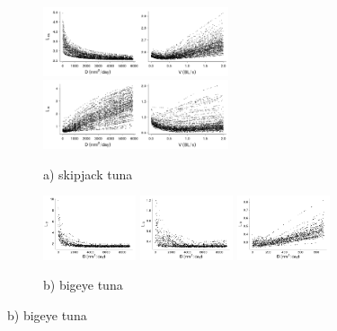 \captionsetup[subfigure] {labelformat=empty,labelfont=bf,textfont=normalfont,singlelinecheck=on}
\begin{figure}
\centering
\begin{subfigure}[b]{1.0\textwidth}
\captionsetup{labelformat=empty, justification = raggedright, singlelinecheck = false}   
\caption{a) skipjack tuna}
\includegraphics[width=0.6\textwidth]{chapter4/figs/SA-CL-skj}\\
\includegraphics[width=0.6\textwidth]{chapter4/figs/SA-Tags-skj}\\
\end{subfigure}
\begin{subfigure}[b]{1.0\textwidth}
\captionsetup{labelformat=empty, justification = raggedright, singlelinecheck = false}   
\caption{b) bigeye tuna}
\includegraphics[width=0.3\textwidth]{chapter4/figs/SA-C-sigma-bet}
\includegraphics[width=0.3\textwidth]{chapter4/figs/SA-LF-sigma-bet}
\includegraphics[width=0.3\textwidth]{chapter4/figs/SA-Tags-sigma-bet}\\

\end{subfigure}
\end{figure}
